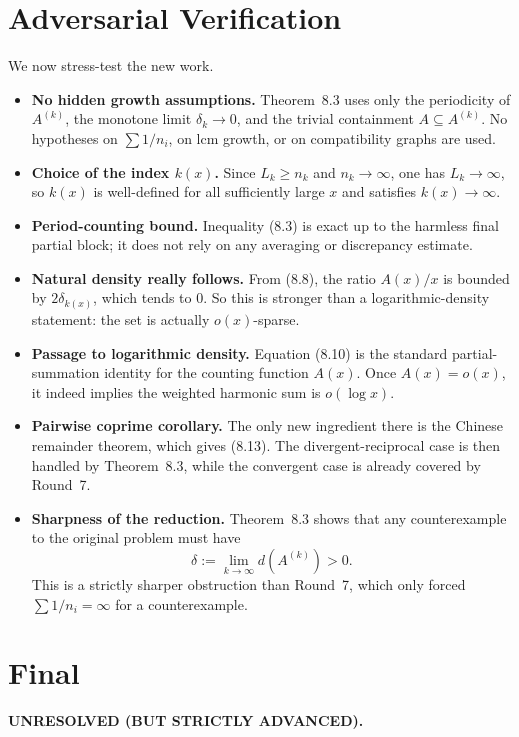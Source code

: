 \section{Adversarial Verification}
We now stress-test the new work.
\begin{itemize}
\item \textbf{No hidden growth assumptions.}  Theorem~8.3 uses only the periodicity of $A^{(k)}$, the monotone limit $\delta_k\to 0$, and the trivial containment $A\subseteq A^{(k)}$.  No hypotheses on $\sum 1/n_i$, on lcm growth, or on compatibility graphs are used.
\item \textbf{Choice of the index $k(x)$.}  Since $L_k\ge n_k$ and $n_k\to\infty$, one has $L_k\to\infty$, so $k(x)$ is well-defined for all sufficiently large $x$ and satisfies $k(x)\to\infty$.
\item \textbf{Period-counting bound.}  Inequality (8.3) is exact up to the harmless final partial block; it does not rely on any averaging or discrepancy estimate.
\item \textbf{Natural density really follows.}  From (8.8), the ratio $A(x)/x$ is bounded by $2\delta_{k(x)}$, which tends to $0$.  So this is stronger than a logarithmic-density statement: the set is actually $o(x)$-sparse.
\item \textbf{Passage to logarithmic density.}  Equation (8.10) is the standard partial-summation identity for the counting function $A(x)$.  Once $A(x)=o(x)$, it indeed implies the weighted harmonic sum is $o(\log x)$.
\item \textbf{Pairwise coprime corollary.}  The only new ingredient there is the Chinese remainder theorem, which gives (8.13).  The divergent-reciprocal case is then handled by Theorem~8.3, while the convergent case is already covered by Round~7.
\item \textbf{Sharpness of the reduction.}  Theorem~8.3 shows that any counterexample to the original problem must have
\begin{equation}
\delta:=\lim_{k\to\infty} d(A^{(k)})>0.
\tag{8.15}
\end{equation}
This is a strictly sharper obstruction than Round~7, which only forced $\sum 1/n_i=\infty$ for a counterexample.
\end{itemize}

\section{Final}
\textbf{UNRESOLVED (BUT STRICTLY ADVANCED).}

